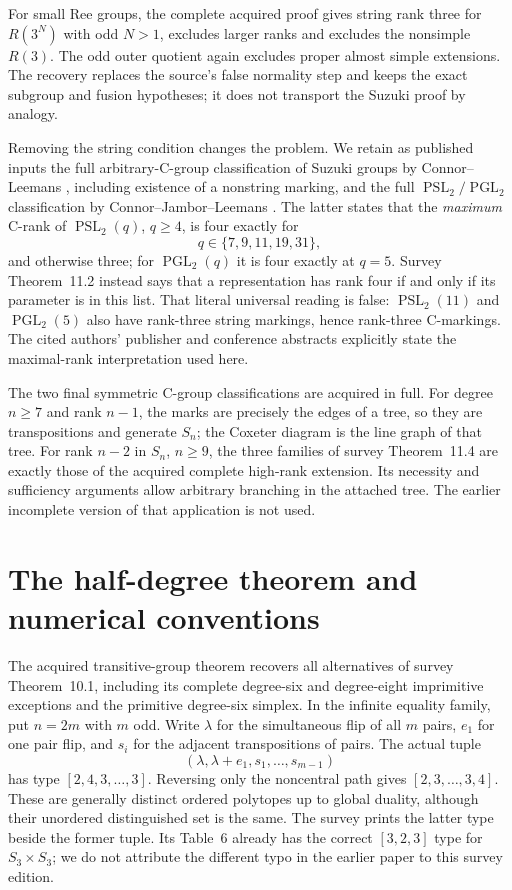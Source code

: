\documentclass[11pt]{article}
\newcommand{\PSL}{\operatorname{PSL}}\newcommand{\PGL}{\operatorname{PGL}}
\newcommand{\note}[1]{\marginpar{\raggedright\scriptsize #1}}
\begin{document}
For small Ree groups, the complete acquired proof gives string rank
three for $R(3^N)$ with odd $N>1$, excludes larger ranks and excludes
the nonsimple $R(3)$. The odd outer quotient again excludes proper
almost simple extensions. The recovery replaces the source's false
normality step and keeps the exact subgroup and fusion hypotheses;
it does not transport the Suzuki proof by analogy.

Removing the string condition changes the problem. We retain as
published inputs the full arbitrary-C-group classification of Suzuki
groups by Connor--Leemans \cite{suzukiC}, including existence of a
nonstring marking, and the full $\PSL_2/\PGL_2$ classification by
Connor--Jambor--Leemans \cite{linearC}. The latter states that the
\emph{maximum} C-rank of $\PSL_2(q)$, $q\ge4$, is four exactly for
\[
                              q\in\{7,9,11,19,31\},
\]
and otherwise three; for $\PGL_2(q)$ it is four exactly at $q=5$.
\note{Correction}
Survey Theorem~11.2 instead says that a representation has rank four
if and only if its parameter is in this list. That literal universal
reading is false: $\PSL_2(11)$ and $\PGL_2(5)$ also have rank-three
string markings, hence rank-three C-markings. The cited authors'
publisher and conference abstracts explicitly state the maximal-rank
interpretation used here.

The two final symmetric C-group classifications are acquired in full.
For degree $n\ge7$ and rank $n-1$, the marks are precisely the edges
of a tree, so they are transpositions and generate $S_n$; the Coxeter
diagram is the line graph of that tree. For rank $n-2$ in $S_n$,
$n\ge9$, the three families of survey Theorem~11.4 are exactly those
of the acquired complete high-rank extension. Its necessity and
sufficiency arguments allow arbitrary branching in the attached tree.
The earlier incomplete version of that application is not used.

\section{The half-degree theorem and numerical conventions}
The acquired transitive-group theorem recovers all alternatives of
survey Theorem~10.1, including its complete degree-six and degree-eight
imprimitive exceptions and the primitive degree-six simplex. In the
infinite equality family, put $n=2m$ with $m$ odd. Write $\lambda$
for the simultaneous flip of all $m$ pairs, $e_1$ for one pair flip,
and $s_i$ for the adjacent transpositions of pairs. The actual tuple
\[
                     (\lambda,\lambda+e_1,s_1,\ldots,s_{m-1})
\]
has type $[2,4,3,\ldots,3]$. Reversing only the noncentral path gives
$[2,3,\ldots,3,4]$. These are generally distinct ordered polytopes
up to global duality, although their unordered distinguished set is
the same. The survey prints the latter type beside the former tuple.
Its Table~6 already has the correct $[3,2,3]$ type for $S_3\times S_3$;
we do not attribute the different typo in the earlier paper to this
survey edition.
\end{document}

